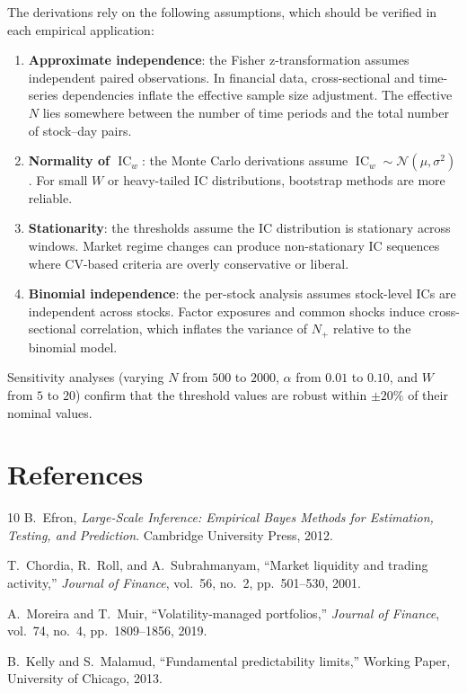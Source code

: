 \documentclass[11pt,a4paper]{article}
\theoremstyle{definition}
\newcommand{\IC}{\operatorname{IC}}
\newcommand{\N}{\mathcal{N}}
\begin{document}
The derivations rely on the following assumptions, which should be verified
in each empirical application:

\begin{enumerate}
    \item \textbf{Approximate independence}: the Fisher z-transformation
          assumes independent paired observations.  In financial data,
          cross-sectional and time-series dependencies inflate the effective
          sample size adjustment.  The effective $N$ lies somewhere between
          the number of time periods and the total number of stock--day pairs.
    \item \textbf{Normality of $\IC_w$}: the Monte Carlo derivations assume
          $\IC_w \sim \N(\mu, \sigma^2)$.  For small $W$ or heavy-tailed IC
          distributions, bootstrap methods are more reliable.
    \item \textbf{Stationarity}: the thresholds assume the IC distribution
          is stationary across windows.  Market regime changes can produce
          non-stationary IC sequences where CV-based criteria are overly
          conservative or liberal.
    \item \textbf{Binomial independence}: the per-stock analysis assumes
          stock-level ICs are independent across stocks.  Factor exposures
          and common shocks induce cross-sectional correlation, which
          inflates the variance of $N_{+}$ relative to the binomial model.
\end{enumerate}

Sensitivity analyses (varying $N$ from $500$ to $2000$, $\alpha$ from
$0.01$ to $0.10$, and $W$ from $5$ to $20$) confirm that the threshold
values are robust within $\pm 20\%$ of their nominal values.

\section*{References}

\begin{thebibliography}{10}
B.~Efron, \emph{Large-Scale Inference: Empirical Bayes Methods for
Estimation, Testing, and Prediction}. Cambridge University Press, 2012.

T.~Chordia, R.~Roll, and A.~Subrahmanyam, ``Market liquidity and trading
activity,'' \emph{Journal of Finance}, vol.~56, no.~2, pp.~501--530, 2001.

A.~Moreira and T.~Muir, ``Volatility-managed portfolios,'' \emph{Journal of
Finance}, vol.~74, no.~4, pp.~1809--1856, 2019.

B.~Kelly and S.~Malamud, ``Fundamental predictability limits,'' Working
Paper, University of Chicago, 2013.
\end{thebibliography}
\end{document}

